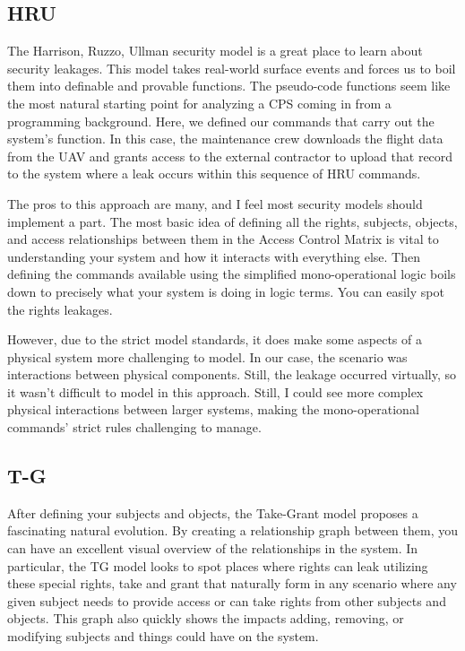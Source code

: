 \documentclass[10pt,journal,compsoc]{IEEEtran}
\begin{document}
\subsection{HRU}

The Harrison, Ruzzo, Ullman security model is a great place to learn about security leakages. This model takes real-world surface events and forces us to boil them into definable and provable functions. The pseudo-code functions seem like the most natural starting point for analyzing a CPS coming in from a programming background. Here, we defined our commands that carry out the system's function. In this case, the maintenance crew downloads the flight data from the UAV and grants access to the external contractor to upload that record to the system where a leak occurs within this sequence of HRU commands. 

The pros to this approach are many, and I feel most security models should implement a part. The most basic idea of defining all the rights, subjects, objects, and access relationships between them in the Access Control Matrix is vital to understanding your system and how it interacts with everything else. Then defining the commands available using the simplified mono-operational logic boils down to precisely what your system is doing in logic terms. You can easily spot the rights leakages. 

However, due to the strict model standards, it does make some aspects of a physical system more challenging to model. In our case, the scenario was interactions between physical components. Still, the leakage occurred virtually, so it wasn't difficult to model in this approach. Still, I could see more complex physical interactions between larger systems, making the mono-operational commands' strict rules challenging to manage. 

\subsection{T-G}

After defining your subjects and objects, the Take-Grant model proposes a fascinating natural evolution. By creating a relationship graph between them, you can have an excellent visual overview of the relationships in the system. In particular, the TG model looks to spot places where rights can leak utilizing these special rights, take and grant that naturally form in any scenario where any given subject needs to provide access or can take rights from other subjects and objects. This graph also quickly shows the impacts adding, removing, or modifying subjects and things could have on the system.
\end{document}
